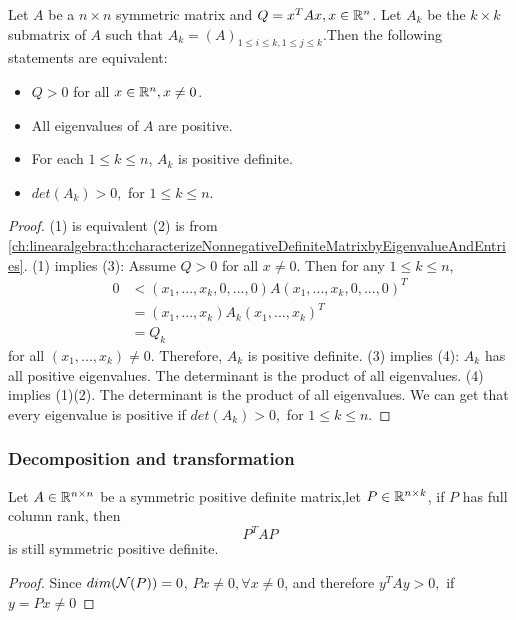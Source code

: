 \begin{refsection}
\begin{lemma}\label{ch:linearalgebra:th:PositiveDefinitenessCharacterizedbySubmatrix}\hfill
Let $A$ be a $n\times n$ symmetric matrix and $Q = x^TAx,x\in \mathbb{R}^n$. Let $A_k$ be the $k\times k$ submatrix of  $A$ such that $A_k = (A)_{1\leq i\leq k,1\leq j\leq k}$.Then the following statements are equivalent:
	\begin{itemize}
		\item $Q > 0$ for all $x\in \mathbb{R}^n, x\neq 0$.
		\item All eigenvalues of $A$ are positive.
		\item For each $1\leq k\leq n$, $A_k$ is positive definite.
		\item $det(A_k) > 0,$ for $1\leq k\leq n$.
	\end{itemize}	
\end{lemma}
\begin{proof}
(1) is equivalent (2) is from \autoref{ch:linearalgebra:th:characterizeNonnegativeDefiniteMatrixbyEigenvalueAndEntries}. (1) implies (3): Assume $Q > 0$ for all $x\neq 0$. Then for any $1\leq k\leq n$, 
\begin{align*}
0 &< (x_1,...,x_k,0,...,0)A(x_1,...,x_k,0,...,0)^T \\
  &= (x_1,...,x_k)A_k (x_1,...,x_k)^T\\
  &= Q_k
\end{align*}
for all $(x_1,...,x_k)\neq 0$. Therefore, $A_k$ is positive definite.
(3) implies (4): $A_k$ has all positive eigenvalues. The determinant is the product of all eigenvalues. (4) implies (1)(2).  The determinant is the product of all eigenvalues. We can get that every eigenvalue is positive if $det(A_k) > 0,$ for $1\leq k\leq n$. 
\end{proof}

\subsubsection{Decomposition and transformation}

\begin{theorem}
Let $A\in \mathbb{R}^{n\times n}$ be a symmetric positive definite matrix,let $P\in \mathbb{R}^{n\times k}$, if $P$ has full column rank, then
$$P^TAP$$ is still symmetric positive definite.
\end{theorem}
\begin{proof}
Since $dim(\mathcal{N}(P)) = 0$, $Px \neq 0,\forall x\neq 0$, and therefore $y^TAy > 0,$ if $y=Px \neq 0$  
\end{proof}


\end{refsection}
